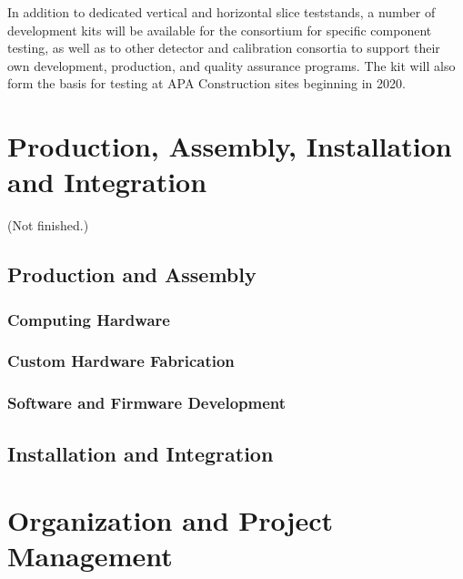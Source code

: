 In addition to dedicated vertical and horizontal slice teststands, a number of
 development kits will be available for the consortium for
specific component testing, as well as to other detector and
calibration consortia to support their own development, production, and quality assurance programs. The  
kit will also form the basis for testing at APA Construction sites beginning in 2020. 

\section{Production, Assembly, Installation and Integration}
\label{sec:sp-daq:production}

(Not finished.)

\subsection{Production and Assembly}

\subsubsection{Computing Hardware}

\subsubsection{Custom Hardware Fabrication}

\subsubsection{Software and Firmware Development}

\subsection{Installation and Integration}


\section{Organization and Project Management}
\label{sec:sp-daq:organization}

